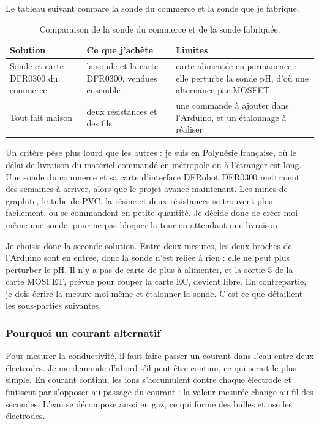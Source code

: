 Le tableau suivant compare la sonde du commerce et la sonde que je fabrique.

\begin{table}[H]
\centering
\small
\begin{tabularx}{\textwidth}{|l|Y|Y|}
\hline
\textbf{Solution} & \textbf{Ce que j'achète} & \textbf{Limites} \\
\hline
Sonde et carte DFR0300 du commerce & la sonde et la carte DFR0300, vendues ensemble & carte alimentée en permanence : elle perturbe la sonde pH, d'où une alternance par MOSFET \\
\hline
Tout fait maison & deux résistances et des fils & une commande à ajouter dans l'Arduino, et un étalonnage à réaliser \\
\hline
\end{tabularx}
\caption{Comparaison de la sonde du commerce et de la sonde fabriquée.}
\end{table}

Un critère pèse plus lourd que les autres : je suis en Polynésie française, où le délai de livraison du matériel commandé en métropole ou à l'étranger est long. Une sonde du commerce et sa carte d'interface DFRobot DFR0300 mettraient des semaines à arriver, alors que le projet avance maintenant. Les mines de graphite, le tube de PVC, la résine et deux résistances se trouvent plus facilement, ou se commandent en petite quantité. Je décide donc de créer moi-même une sonde, pour ne pas bloquer la tour en attendant une livraison.

Je choisis donc la seconde solution. Entre deux mesures, les deux broches de l'Arduino sont en entrée, donc la sonde n'est reliée à rien : elle ne peut plus perturber le pH. Il n'y a pas de carte de plus à alimenter, et la sortie 5 de la carte MOSFET, prévue pour couper la carte EC, devient libre. En contrepartie, je dois écrire la mesure moi-même et étalonner la sonde. C'est ce que détaillent les sous-parties suivantes.

\subsubsection*{Pourquoi un courant alternatif}

Pour mesurer la conductivité, il faut faire passer un courant dans l'eau entre deux électrodes. Je me demande d'abord s'il peut être continu, ce qui serait le plus simple. En courant continu, les ions s'accumulent contre chaque électrode et finissent par s'opposer au passage du courant : la valeur mesurée change au fil des secondes. L'eau se décompose aussi en gaz, ce qui forme des bulles et use les électrodes.

